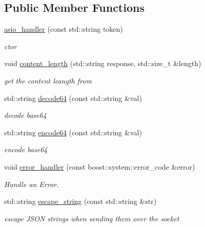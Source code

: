 \subsection*{Public Member Functions}
\begin{DoxyCompactItemize}
\item 
\hyperlink{classrapp_1_1cloud_1_1asio__handler_a144c5c14ac7f31a897920905ad6af353}{asio\-\_\-handler} (const std\-::string token)
\begin{DoxyCompactList}\small\item\em ctor \end{DoxyCompactList}\item 
void \hyperlink{classrapp_1_1cloud_1_1asio__handler_acdcc6b42de095be0dfd03130a1a611ef}{content\-\_\-length} (std\-::string response, std\-::size\-\_\-t \&length)
\begin{DoxyCompactList}\small\item\em get the content leangth from \end{DoxyCompactList}\item 
std\-::string \hyperlink{classrapp_1_1cloud_1_1asio__handler_ab28177dac12c438dd460d7ff0ca2572b}{decode64} (const std\-::string \&val)
\begin{DoxyCompactList}\small\item\em decode base64 \end{DoxyCompactList}\item 
std\-::string \hyperlink{classrapp_1_1cloud_1_1asio__handler_aebcef6a5afce74db8e92ac294aedfec8}{encode64} (const std\-::string \&val)
\begin{DoxyCompactList}\small\item\em encode base64 \end{DoxyCompactList}\item 
void \hyperlink{classrapp_1_1cloud_1_1asio__handler_a65bb45be483810d655b757608460e8da}{error\-\_\-handler} (const boost\-::system\-::error\-\_\-code \&error)
\begin{DoxyCompactList}\small\item\em Handle an Error. \end{DoxyCompactList}\item 
std\-::string \hyperlink{classrapp_1_1cloud_1_1asio__handler_a61462334625078bb44938d82df423e70}{escape\-\_\-string} (const std\-::string \&str)
\begin{DoxyCompactList}\small\item\em escape J\-S\-O\-N strings when sending them over the socket \end{DoxyCompactList}\item 

\end{DoxyCompactItemize}

